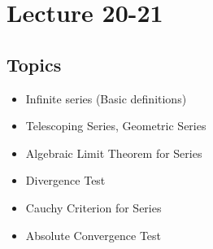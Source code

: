 \documentclass[a4paper]{article}
\begin{document}
\section{Lecture 20-21}
\subsection{Topics}

\begin{itemize}
    \item Infinite series (Basic definitions)
    \item Telescoping Series, Geometric Series
    \item Algebraic Limit Theorem for Series
    \item Divergence Test
    \item Cauchy Criterion for Series
    \item Absolute Convergence Test
\end{itemize}
\end{document}
